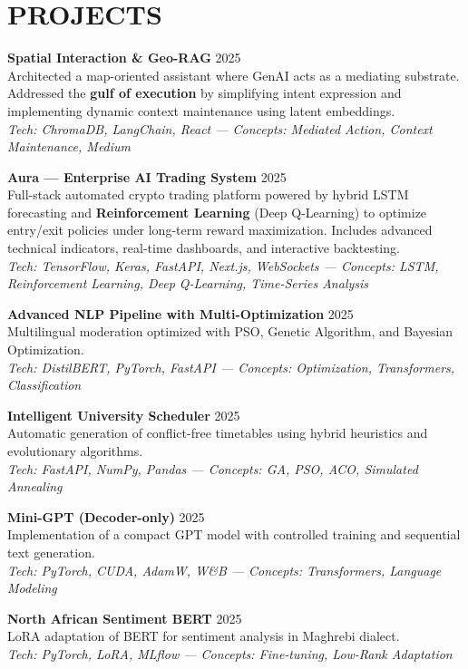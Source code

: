 \documentclass[a4paper,12pt]{article}
\begin{document}
\section{PROJECTS}
\setlength{\parskip}{10pt}
{\small

\textbf{Spatial Interaction \& Geo-RAG} \hfill 2025 \\
Architected a map-oriented assistant where GenAI acts as a mediating substrate. Addressed the \textbf{gulf of execution} by simplifying intent expression and implementing dynamic context maintenance using latent embeddings. \\
\textit{Tech: ChromaDB, LangChain, React — Concepts: Mediated Action, Context Maintenance, Medium}

\textbf{Aura — Enterprise AI Trading System} \hfill 2025 \\
Full-stack automated crypto trading platform powered by hybrid LSTM forecasting and \textbf{Reinforcement Learning} (Deep Q-Learning) to optimize entry/exit policies under long-term reward maximization. Includes advanced technical indicators, real-time dashboards, and interactive backtesting. \\
\textit{Tech: TensorFlow, Keras, FastAPI, Next.js, WebSockets — Concepts: LSTM, Reinforcement Learning, Deep Q-Learning, Time-Series Analysis}

\textbf{Advanced NLP Pipeline with Multi-Optimization} \hfill 2025 \\
Multilingual moderation optimized with PSO, Genetic Algorithm, and Bayesian Optimization. \\
\textit{Tech: DistilBERT, PyTorch, FastAPI — Concepts: Optimization, Transformers, Classification}

\textbf{Intelligent University Scheduler} \hfill 2025 \\
Automatic generation of conflict-free timetables using hybrid heuristics and evolutionary algorithms. \\
\textit{Tech: FastAPI, NumPy, Pandas — Concepts: GA, PSO, ACO, Simulated Annealing}

\textbf{Mini-GPT (Decoder-only)} \hfill 2025 \\
Implementation of a compact GPT model with controlled training and sequential text generation. \\
\textit{Tech: PyTorch, CUDA, AdamW, W\&B — Concepts: Transformers, Language Modeling}

\textbf{North African Sentiment BERT} \hfill 2025 \\
LoRA adaptation of BERT for sentiment analysis in Maghrebi dialect. \\
\textit{Tech: PyTorch, LoRA, MLflow — Concepts: Fine-tuning, Low-Rank Adaptation}

}
\end{document}
